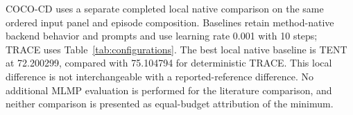 COCO-CD uses a separate completed local native comparison on the same ordered input panel and episode composition. Baselines retain method-native backend behavior and prompts and use learning rate 0.001 with 10 steps; TRACE uses Table~\ref{tab:configurations}. The best local native baseline is TENT at 72.200299, compared with 75.104794 for deterministic TRACE. This local difference is not interchangeable with a reported-reference difference. No additional MLMP evaluation is performed for the literature comparison, and neither comparison is presented as equal-budget attribution of the minimum.

